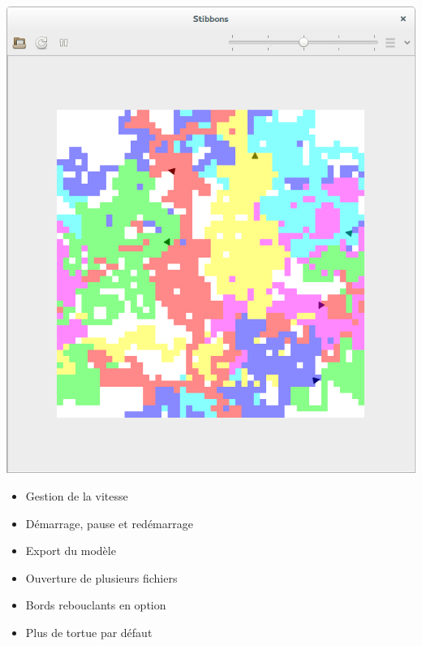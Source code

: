 \begin{frame}
\begin{center}
\includegraphics[scale=0.16]{doc/report/screenshot/stibbons-0-4-2.png}
\end{center}

\begin{itemize}
	\item Gestion de la vitesse
	\item Démarrage, pause et redémarrage
	\item Export du modèle
	\item Ouverture de plusieurs fichiers
	\item Bords rebouclants en option
	\item Plus de tortue par défaut
\end{itemize}
\end{frame}

